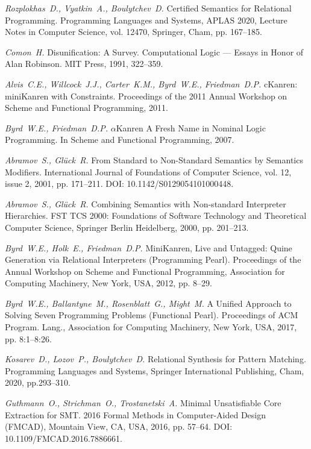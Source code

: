 {\em Rozplokhas~D., Vyatkin~A., Boulytchev~D.} Certified Semantics for Relational Programming. Programming Languages and Systems, APLAS 2020, Lecture Notes in Computer Science, vol. 12470, Springer, Cham, pp. 167--185.

{\em Comon~H.}  Disunification: A Survey. Computational Logic --- Essays in Honor of Alan Robinson. MIT Press, 1991, 322--359.

{\em Alvis~C.E., Willcock~J.J., Carter~K.M., Byrd~W.E., Friedman~D.P.} cKanren: miniKanren with Constraints. Proceedings of the 2011 Annual Workshop on Scheme and Functional Programming, 2011.

{\em Byrd~W.E., Friedman~D.P.} $\alpha$Kanren A Fresh Name in Nominal Logic Programming. In Scheme and Functional Programming, 2007.

{\em Abramov~S., Gl{\"u}ck~R.} From Standard to Non-Standard Semantics by Semantics Modifiers. International Journal of Foundations of Computer Science, vol. 12, issue 2, 2001, pp. 171--211. DOI: 10.1142/S0129054101000448.

{\em Abramov~S., Gl{\"u}ck~R.} Combining Semantics with Non-standard Interpreter Hierarchies. FST TCS 2000: Foundations of Software Technology and Theoretical Computer Science, Springer Berlin Heidelberg, 2000, pp. 201--213.

{\em Byrd~W.E., Holk~E., Friedman~D.P.} MiniKanren, Live and Untagged: Quine Generation via Relational Interpreters (Programming Pearl). Proceedings of the Annual Workshop on Scheme and Functional Programming, Association for Computing Machinery, New York, USA, 2012, pp. 8--29.

{\em Byrd~W.E., Ballantyne~M., Rosenblatt~G., Might~M.} A Unified Approach to Solving Seven Programming Problems (Functional Pearl). Proceedings of ACM Program. Lang., Association for Computing Machinery, New York, USA, 2017, pp. 8:1--8:26.

{\em Kosarev~D., Lozov~P., Boulytchev~D.} Relational Synthesis for Pattern Matching. Programming Languages and Systems, Springer International Publishing, Cham, 2020, pp.293--310.

{\em Guthmann~O., Strichman~O., Trostanetski~A.} Minimal Unsatisfiable Core Extraction for SMT. 2016 Formal Methods in Computer-Aided Design (FMCAD), Mountain View, CA, USA, 2016, pp. 57--64. DOI: 10.1109/FMCAD.2016.7886661.

